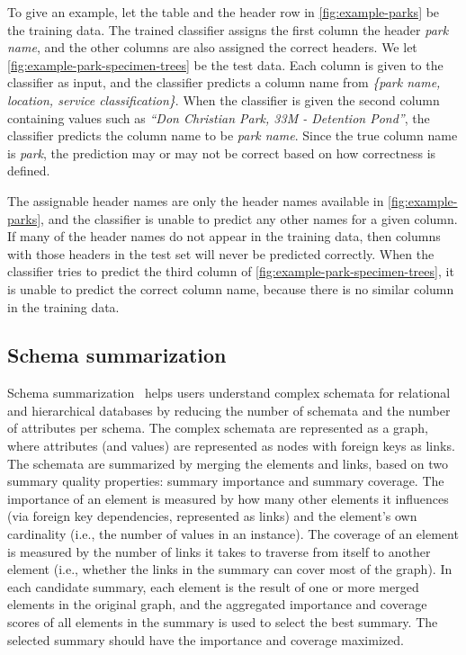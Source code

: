 To give an example, let the table and the header row in \autoref{fig:example-parks} be the training data. The trained classifier assigns the first column the header \textit{park name}, and the other columns are also assigned the correct headers. We let \autoref{fig:example-park-specimen-trees} be the test data. Each column is given to the classifier as input, and the classifier predicts a column name from \textit{\{park name, location, service classification\}}. When the classifier is given the second column containing values such as \textit{``Don Christian Park, 33M - Detention Pond''}, the classifier predicts the column name to be \textit{park name}. Since the true column name is \textit{park}, the prediction may or may not be correct based on how correctness is defined.

The assignable header names are only the header names available in \autoref{fig:example-parks}, and the classifier is unable to predict any other names for a given column. If many of the header names do not appear in the training data, then columns with those headers in the test set will never be predicted correctly. When the classifier tries to predict the third column of \autoref{fig:example-park-specimen-trees}, it is unable to predict the correct column name, because there is no similar column in the training data.

\subsection{Schema summarization}
\label{ssec:SchemaSummarization}

Schema summarization~\cite{Yu2006Schema} helps users understand complex schemata for relational and hierarchical databases by reducing the number of schemata and the number of attributes per schema. The complex schemata are represented as a graph, where attributes (and values) are represented as nodes with foreign keys as links. The schemata are summarized by merging the elements and links, based on two summary quality properties: summary importance and summary coverage. The importance of an element is measured by how many other elements it influences (via foreign key dependencies, represented as links) and the element's own cardinality (i.e., the number of values in an instance). The coverage of an element is measured by the number of links it takes to traverse from itself to another element (i.e., whether the links in the summary can cover most of the graph). In each candidate summary, each element is the result of one or more merged elements in the original graph, and the aggregated importance and coverage scores of all elements in the summary is used to select the best summary. The selected summary should have the importance and coverage maximized.

